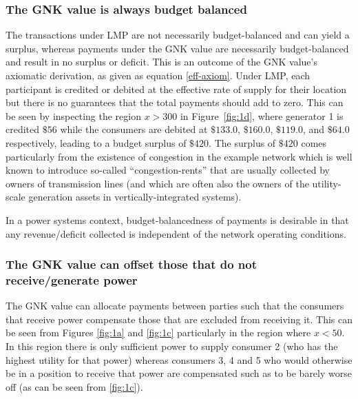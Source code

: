 \subsubsection*{The GNK value is always budget balanced}
The transactions under LMP are not necessarily budget-balanced and can yield a surplus, whereas payments under the GNK value are necessarily budget-balanced and result in no surplus or deficit.
This is an outcome of the GNK value's axiomatic derivation, as given as equation \eqref{eff-axiom}.
Under LMP, each participant is credited or debited at the effective rate of supply for their location but there is no guarantees that the total payments should add to zero.
This can be seen by inspecting the region $x>300$ in Figure~\ref{fig:1d}, where generator 1 is credited $\$56$ while the consumers are debited at $\$133.0$, $\$160.0$, $\$119.0$, and $\$64.0$ respectively, leading to a budget surplus of $\$420$.
The surplus of $\$420$ comes particularly from the existence of congestion in the example network which is well known to introduce so-called ``congestion-rents'' that are usually collected by owners of transmission lines \cite{lmp2} (and which are often also the owners of the utility-scale generation assets in vertically-integrated systems).

In a power systems context, budget-balancedness of payments is desirable in that any revenue/deficit collected is independent of the network operating conditions.

\subsubsection*{The GNK value can offset those that do not receive/generate power}
The GNK value can allocate payments between parties such that the consumers that receive power compensate those that are excluded from receiving it.
This can be seen from Figures \ref{fig:1a} and \ref{fig:1c} particularly in the region where $x<50$.
In this region there is only sufficient power to supply consumer 2 (who has the highest utility for that power) whereas consumers 3, 4 and 5 who would otherwise be in a position to receive that power are
compensated such as to be barely worse off (as can be seen from \ref{fig:1c}).

